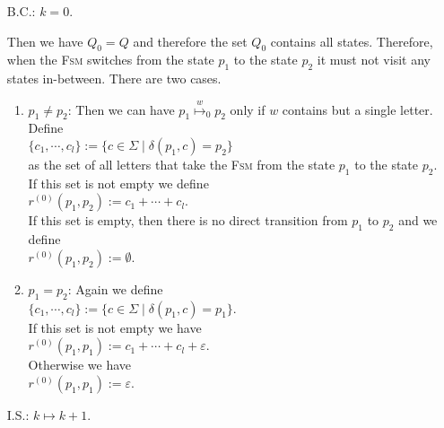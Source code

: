 \begin{enumerate}
\item[B.C.:] $k = 0$.  

  Then we have $Q_0 = Q$ and therefore the set $Q_0$ contains all states.
  Therefore, when the \textsc{Fsm} switches from the state $p_1$ to the state $p_2$ it must not visit any
  states in-between.  There are two cases.
  \begin{enumerate}
  \item $p_1 \not= p_2$:  Then we can have  $p_1 \stackrel{w}{\mapsto}_0 p_2$ only if $w$ contains but a
        single letter.  Define
        \\[0.2cm]
        \hspace*{1.3cm}
        $\{ c_1, \cdots, c_l \} := \{ c \in \Sigma \mid \delta(p_1,c) = p_2 \}$
        \\[0.2cm]
        as the set of all letters that take the \textsc{Fsm} from the state $p_1$ to the state $p_2$.
        If this set is not empty we define 
        \\[0.2cm]
        \hspace*{1.3cm}
        $r^{(0)}(p_1, p_2) := c_1 + \cdots + c_l$. 
        \\[0.2cm]
        If this set is empty, then there is no direct transition from  $p_1$ to $p_2$ and we define
        \\[0.2cm]
        \hspace*{1.3cm}
        $r^{(0)}(p_1, p_2) := \emptyset$.
  \item $p_1 = p_2$:  Again we define
        \\[0.2cm]
        \hspace*{1.3cm}
        $\{ c_1, \cdots, c_l \} := \{ c \in \Sigma \mid \delta(p_1,c) = p_1 \}$.
        \\[0.2cm]
        If this set is not empty we have
        \\[0.2cm]
        \hspace*{1.3cm}
        $r^{(0)}(p_1, p_1) := c_1 + \cdots + c_l + \varepsilon$.
        \\[0.2cm]
        Otherwise we have
        \\[0.2cm]
        \hspace*{1.3cm}
        $r^{(0)}(p_1, p_1) := \varepsilon$.
   \end{enumerate}
\item[I.S.:] $k \mapsto k+1$.  


\end{enumerate}
